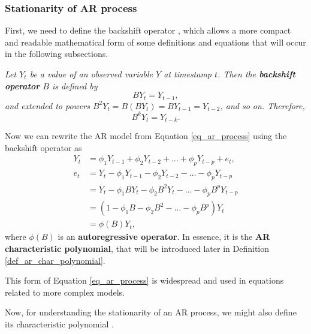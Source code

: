 \subsubsection{Stationarity of AR process}

First, we need to define the backshift operator \cite{shumway2011}, which allows a more compact and readable mathematical form of some definitions and equations that will occur in the following subsections. 

\begin{definition}
\textit{Let $Y_t$ be a value of an observed variable $Y$ at timestamp $t$. Then the \textbf{backshift operator} $B$ is defined by
\begin{equation*}
    BY_t = Y_{t-1},
\end{equation*}
and extended to powers $B^{2}Y_{t} = B(BY_t) = BY_{t-1} = Y_{t-2}$, and so on. Therefore, \begin{equation}
    B^{k}Y_t = Y_{t-k}.
    \label{eq_backshift_operator}
\end{equation}}
\end{definition} 

Now we can rewrite the AR model from Equation \ref{eq_ar_process} using the backshift operator as
\begin{equation}
\begin{aligned}
    Y_t &= \phi_{1}Y_{t-1} + \phi_{2}Y_{t-2} + \ldots + \phi_{p}Y_{t-p} + e_t, \\
    e_t &= Y_t - \phi_{1}Y_{t-1} - \phi_{2}Y_{t-2} - \ldots - \phi_{p}Y_{t-p} \\
        &= Y_t - \phi_{1}BY_t - \phi_{2}B^{2}Y_t - \ldots - \phi_{p}B^{p}Y_{t-p} \\
        &= (1 - \phi_{1}B - \phi_{2}B^2 - \ldots - \phi_{p}B^p)Y_t \\
        &= \phi(B)Y_t,
    \label{eq_ar_operator}
\end{aligned}
\end{equation}
where $\phi(B)$ is an \textbf{autoregressive operator}. In essence, it is the \textbf{AR characteristic polynomial}, that will be introduced later in Definition \ref{def_ar_char_polynomial}.

This form of Equation \ref{eq_ar_process} is widespread and used in equations related to more complex models.

Now, for understanding the stationarity of an AR process, we might also define its characteristic polynomial \cite{cryer2008time}.

